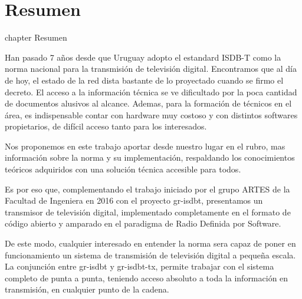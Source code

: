 \chapter*{Resumen}
 {chapter} {Resumen}%

Han pasado 7 años desde que Uruguay adopto el estandard ISDB-T como la norma nacional para la transmisión de televisión digital. Encontramos que al día de hoy, el estado de la red dista bastante de lo proyectado cuando se firmo el decreto. El acceso a la información técnica se ve dificultado por la poca cantidad de documentos alusivos al alcance. Ademas, para la formación de técnicos en el área, es indispensable contar con hardware muy costoso y con distintos softwares propietarios, de difícil acceso tanto para los interesados.

Nos proponemos en este trabajo aportar desde nuestro lugar en el rubro, mas información sobre la norma y su implementación, respaldando los conocimientos teóricos adquiridos con una solución técnica accesible para todos. 

Es por eso que, complementando el trabajo iniciado por el grupo ARTES de la Facultad de Ingeniera en 2016 con el proyecto gr-isdbt, presentamos un transmisor de televisión digital, implementado completamente en el formato de código abierto y amparado en el paradigma de Radio Definida por Software. 

De este modo, cualquier interesado en entender la norma sera capaz de poner en funcionamiento un sistema de transmisión de televisión digital a pequeña escala. La conjunción entre gr-isdbt y gr-isdbt-tx, permite trabajar con el sistema completo de punta a punta, teniendo acceso absoluto a toda la información en transmisión, en cualquier punto de la cadena.
